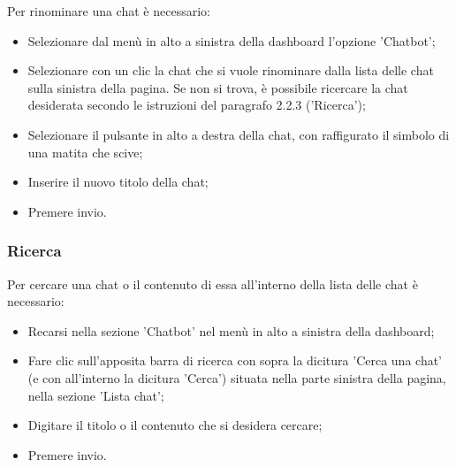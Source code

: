 \documentclass[10pt, a4paper]{article}
\begin{document}
Per rinominare una chat è necessario:
\begin{itemize}
    \item Selezionare dal menù in alto a sinistra della dashboard l'opzione 'Chatbot';
    \item Selezionare con un clic la chat che si vuole rinominare dalla lista delle chat sulla sinistra della pagina. Se non si trova, è possibile ricercare la chat desiderata secondo le istruzioni del paragrafo 2.2.3 ('Ricerca');
    \item Selezionare il pulsante in alto a destra della chat, con raffigurato il simbolo di una matita che scive;
    \item Inserire il nuovo titolo della chat;
    \item Premere invio.
\end{itemize}

\subsubsection{Ricerca}
Per cercare una chat o il contenuto di essa all'interno della lista delle chat è necessario:
\begin{itemize}
    \item Recarsi nella sezione 'Chatbot' nel menù in alto a sinistra della dashboard;
    \item Fare clic sull'apposita barra di ricerca con sopra la dicitura 'Cerca una chat' (e con all'interno la dicitura 'Cerca') situata nella parte sinistra della pagina, nella sezione 'Lista chat';
    \item Digitare il titolo o il contenuto che si desidera cercare;
    \item Premere invio.
\end{itemize} 
\end{document}
